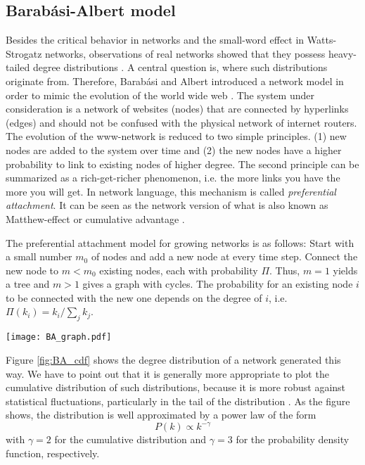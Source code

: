 \subsection{Barab\'asi-Albert model}
Besides the critical behavior in \ER networks and the small-word effect in Watts-Strogatz networks, observations of real networks showed that they possess heavy-tailed degree distributions \citep{Barabasi99,Liljeros:2001p841}.
A central question is, where such distributions originate from.
Therefore, Barab\'asi and Albert introduced a network model in order to mimic the evolution of the world wide web \citep{Barabasi99}.
The system under consideration is a network of websites (nodes) that are connected by hyperlinks (edges) and should not be confused with the physical network of internet routers.
The evolution of the www-network is reduced to two simple principles.
(1) new nodes are added to the system over time and (2) the new nodes have a higher probability to link to existing nodes of higher degree.
The second principle can be summarized as a rich-get-richer phenomenon, i.e. the more links you have the more you will get.
In network language, this mechanism is called \emph{preferential attachment}.
It can be seen as the network version of what is also known as Matthew-effect or cumulative advantage \citep{Merton:1968fh,price:1976}.

The preferential attachment model for growing networks is as follows:
Start with a small number $m_0$ of nodes and add a new node at every time step.
Connect the new node to $m<m_0$ existing nodes, each with probability $\Pi $.
Thus, $m=1$ yields a tree and $m>1$ gives a graph with cycles.
The probability for an existing node $i$ to be connected with the new one depends on the degree of $i$, i.e. $\Pi (k_i)=k_i/\sum _j k_j$.
\begin{SCfigure}
\texttt{[image: BA\_graph.pdf]}
\caption{Cumulative degree distribution of a \BA graph with $N=10^5$ nodes and $m_0=m=5$.
The dashed line shows a power-law $P(k)\propto k^{-2}$.}
\label{fig:BA_cdf}
\end{SCfigure}

Figure \ref{fig:BA_cdf} shows the degree distribution of a network generated this way.
We have to point out that it is generally more appropriate to plot the cumulative distribution of such distributions, because it is more robust against statistical fluctuations, particularly in the tail of the distribution \citep{Clauset:2009}.
As the figure shows, the distribution is well approximated by a power law of the form
\[
P(k)\propto k^{-\gamma }
\]
with $\gamma =2$ for the cumulative distribution and $\gamma = 3$ for the probability density function, respectively.

